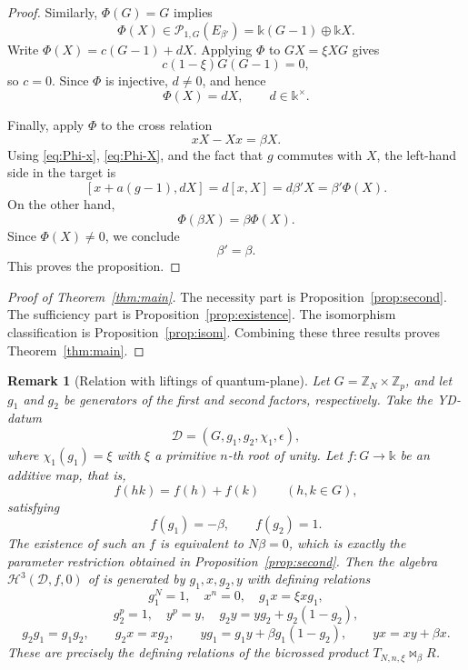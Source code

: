 \documentclass[twoside,11pt]{amsart}
\newtheorem{rmk}[defi]{Remark}
\newcommand{\K}{\mathds{k}}
\newcommand{\Z}{\mathbb{Z}}
\newcommand{\Pp}{\mathcal{P}}
\newcommand{\cH}{\mathcal{H}}
\begin{document}
\begin{proof}
		Similarly, $\Phi(G)=G$ implies
		\[
		\Phi(X)\in\Pp_{1,G}(E_{\beta'})
		=\K(G-1)\oplus\K X.
		\]
		Write $\Phi(X)=c(G-1)+dX$. Applying $\Phi$ to $GX=\xi XG$ gives
		\[
		c(1-\xi)G(G-1)=0,
		\]
		so $c=0$. Since $\Phi$ is injective, $d\ne0$, and hence
		\begin{equation}\label{eq:Phi-X}
			\Phi(X)=dX,
			\qquad d\in\K^\times.
		\end{equation}
		
		Finally, apply $\Phi$ to the cross relation
		\[
		xX-Xx=\beta X.
		\]
		Using \eqref{eq:Phi-x}, \eqref{eq:Phi-X}, and the fact that $g$ commutes with
		$X$, the left-hand side in the target is
		\[
		[x+a(g-1),dX]
		=d[x,X]
		=d\beta'X
		=\beta'\Phi(X).
		\]
		On the other hand,
		\[
		\Phi(\beta X)=\beta\Phi(X).
		\]
		Since $\Phi(X)\ne0$, we conclude
		\[
		\beta'=\beta.
		\]
		This proves the proposition.
	\end{proof}
	
	\begin{proof}[Proof of Theorem~\ref{thm:main}]
		The necessity part is Proposition~\ref{prop:second}. The sufficiency
		part is Proposition~\ref{prop:existence}. The isomorphism classification
		is Proposition~\ref{prop:isom}. Combining these three results proves
		Theorem~\ref{thm:main}.
	\end{proof}
	
	
	\begin{rmk}[Relation with liftings of  quantum-plane]\label{rmk:quantum-plane}
		Let $G=\Z_N\times\Z_p$, and let $g_1$ and $g_2$ be generators of the
		first and second factors, respectively. Take the YD-datum
		\[
		\mathcal D=(G,g_1,g_2,\chi_1,\epsilon),
		\]
		where $\chi_1(g_1)=\xi$ with $\xi$ a primitive $n$-th root of unity.
		Let $f:G\to\K$ be an additive map, that is,
		\[
		f(hk)=f(h)+f(k)\qquad (h,k\in G),
		\]
		satisfying
		\[
		f(g_1)=-\beta,\qquad f(g_2)=1.
		\]
		The existence of such an $f$ is equivalent to $N\beta=0$, which is
		exactly the parameter restriction obtained in
		Proposition~\ref{prop:second}. Then the algebra
		$\cH^3(\mathcal D,f,0)$ of \cite{Xpq2} is generated by
		$g_1,x,g_2,y$ with defining relations
		\[
		g_1^N=1,\quad x^n=0,\quad g_1x=\xi xg_1,
		\]
		\[
		g_2^p=1,\quad y^p=y,\quad g_2y=yg_2+g_2(1-g_2),
		\]
		\[
		g_2g_1=g_1g_2,\qquad
		g_2x=xg_2,\qquad
		yg_1=g_1y+\beta g_1(1-g_2),\qquad
		yx=xy+\beta x.
		\]
		These are precisely the defining relations of the bicrossed product
		$T_{N,n,\xi}\bowtie_\beta R$.
	\end{rmk}
	
\end{document}
